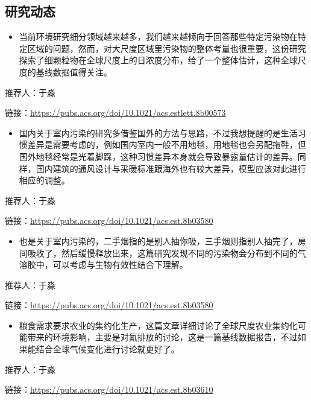 \documentclass[]{book}
\providecommand{\tightlist}{%
  \setlength{\itemsep}{0pt}\setlength{\parskip}{0pt}}
\begin{document}
\hypertarget{ux7814ux7a76ux52a8ux6001-12}{%
\subsection*{研究动态}\label{ux7814ux7a76ux52a8ux6001-12}}

\begin{itemize}
\tightlist
\item
  当前环境研究细分领域越来越多，我们越来越倾向于回答那些特定污染物在特定区域的问题，然而，对大尺度区域里污染物的整体考量也很重要，这份研究探索了细颗粒物在全球尺度上的日浓度分布，给了一个整体估计，这种全球尺度的基线数据值得关注。
\end{itemize}

推荐人：于淼

链接：\url{https://pubs.acs.org/doi/10.1021/acs.estlett.8b00573}

\begin{itemize}
\tightlist
\item
  国内关于室内污染的研究多借鉴国外的方法与思路，不过我想提醒的是生活习惯差异是需要考虑的，例如国内室内一般不用地毯，用地毯也会另配拖鞋，但国外地毯经常是光着脚踩，这种习惯差异本身就会导致暴露量估计的差异。同样，国内建筑的通风设计与采暖标准跟海外也有较大差异，模型应该对此进行相应的调整。
\end{itemize}

推荐人：于淼

链接：\url{https://pubs.acs.org/doi/10.1021/acs.est.8b03580}

\begin{itemize}
\tightlist
\item
  也是关于室内污染的，二手烟指的是别人抽你吸，三手烟则指别人抽完了，房间吸收了，然后缓慢释放出来，这篇研究发现不同的污染物会分布到不同的气溶胶中，可以考虑与生物有效性结合下理解。
\end{itemize}

推荐人：于淼

链接：\url{https://pubs.acs.org/doi/10.1021/acs.est.8b03580}

\begin{itemize}
\tightlist
\item
  粮食需求要求农业的集约化生产，这篇文章详细讨论了全球尺度农业集约化可能带来的环境影响，主要是对氮排放的讨论，这是一篇基线数据报告，不过如果能结合全球气候变化进行讨论就更好了。
\end{itemize}

推荐人：于淼

链接：\url{https://pubs.acs.org/doi/10.1021/acs.est.8b03610}
\end{document}
